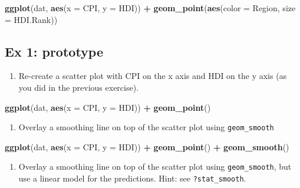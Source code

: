 \documentclass[]{book}
\newenvironment{Shaded}{\begin{snugshade}}{\end{snugshade}}
\newcommand{\KeywordTok}[1]{\textcolor[rgb]{0.13,0.29,0.53}{\textbf{#1}}}
\newcommand{\DataTypeTok}[1]{\textcolor[rgb]{0.13,0.29,0.53}{#1}}
\newcommand{\StringTok}[1]{\textcolor[rgb]{0.31,0.60,0.02}{#1}}
\newcommand{\OperatorTok}[1]{\textcolor[rgb]{0.81,0.36,0.00}{\textbf{#1}}}
\newcommand{\NormalTok}[1]{#1}
\providecommand{\tightlist}{%
  \setlength{\itemsep}{0pt}\setlength{\parskip}{0pt}}
\begin{document}
\begin{Shaded}
\begin{Highlighting}[]
\KeywordTok{ggplot}\NormalTok{(dat, }\KeywordTok{aes}\NormalTok{(}\DataTypeTok{x =}\NormalTok{ CPI, }\DataTypeTok{y =}\NormalTok{ HDI)) }\OperatorTok{+}
\KeywordTok{geom_point}\NormalTok{(}\KeywordTok{aes}\NormalTok{(}\DataTypeTok{color =}\NormalTok{ Region, }\DataTypeTok{size =}\NormalTok{  HDI.Rank))}
\end{Highlighting}
\end{Shaded}

\subsection{Ex 1: prototype}\label{ex-1-prototype-2}

\begin{enumerate}
\def\labelenumi{\arabic{enumi}.}
\tightlist
\item
  Re-create a scatter plot with CPI on the x axis and HDI on the y axis
  (as you did in the previous exercise).
\end{enumerate}

\begin{Shaded}
\begin{Highlighting}[]
\KeywordTok{ggplot}\NormalTok{(dat, }\KeywordTok{aes}\NormalTok{(}\DataTypeTok{x =}\NormalTok{ CPI, }\DataTypeTok{y =}\NormalTok{ HDI)) }\OperatorTok{+}
\StringTok{  }\KeywordTok{geom_point}\NormalTok{()}
\end{Highlighting}
\end{Shaded}

\begin{enumerate}
\def\labelenumi{\arabic{enumi}.}
\setcounter{enumi}{1}
\tightlist
\item
  Overlay a smoothing line on top of the scatter plot using
  \texttt{geom\_smooth}
\end{enumerate}

\begin{Shaded}
\begin{Highlighting}[]
\KeywordTok{ggplot}\NormalTok{(dat, }\KeywordTok{aes}\NormalTok{(}\DataTypeTok{x =}\NormalTok{ CPI, }\DataTypeTok{y =}\NormalTok{ HDI)) }\OperatorTok{+}
\StringTok{  }\KeywordTok{geom_point}\NormalTok{() }\OperatorTok{+}
\StringTok{  }\KeywordTok{geom_smooth}\NormalTok{()}
\end{Highlighting}
\end{Shaded}

\begin{enumerate}
\def\labelenumi{\arabic{enumi}.}
\setcounter{enumi}{2}
\tightlist
\item
  Overlay a smoothing line on top of the scatter plot using
  \texttt{geom\_smooth}, but use a linear model for the predictions.
  Hint: see \texttt{?stat\_smooth}.
\end{enumerate}
\end{document}
